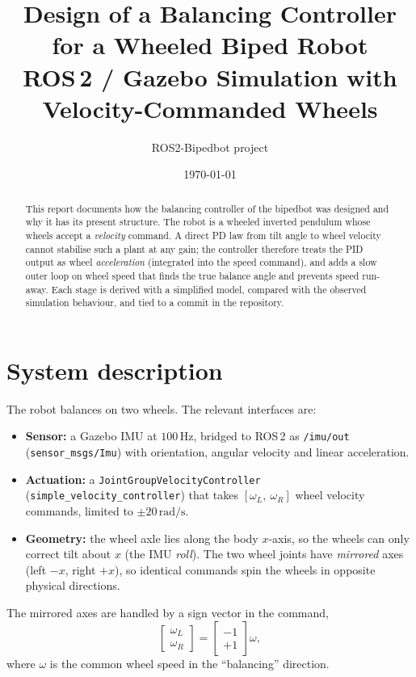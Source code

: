 \documentclass[11pt,a4paper]{article}
\title{Design of a Balancing Controller for a Wheeled Biped Robot\\
\large ROS\,2 / Gazebo Simulation with Velocity-Commanded Wheels}
\author{ROS2-Bipedbot project}
\date{\today}
\newcommand{\rads}{\,\mathrm{rad/s}}
\begin{document}
\maketitle

\begin{abstract}
This report documents how the balancing controller of the bipedbot was
designed and why it has its present structure. The robot is a wheeled
inverted pendulum whose wheels accept a \emph{velocity} command. A direct PD
law from tilt angle to wheel velocity cannot stabilise such a plant at any
gain; the controller therefore treats the PID output as wheel
\emph{acceleration} (integrated into the speed command), and adds a slow
outer loop on wheel speed that finds the true balance angle and prevents
speed run-away. Each stage is derived with a simplified model, compared with
the observed simulation behaviour, and tied to a commit in the repository.
\end{abstract}

\tableofcontents
\newpage

\section{System description}
The robot balances on two wheels. The relevant interfaces are:

\begin{itemize}
  \item \textbf{Sensor:} a Gazebo IMU at $100\,\mathrm{Hz}$, bridged to ROS\,2 as
        \texttt{/imu/out} (\texttt{sensor\_msgs/Imu}) with orientation,
        angular velocity and linear acceleration.
  \item \textbf{Actuation:} a \texttt{JointGroup\allowbreak Velocity\allowbreak Controller}
        (\texttt{simple\_\allowbreak velocity\_\allowbreak controller}) that takes
        $[\omega_L,\ \omega_R]$ wheel velocity commands, limited to
        $\pm 20\rads$.
  \item \textbf{Geometry:} the wheel axle lies along the body $x$-axis, so the
        wheels can only correct tilt about $x$ (the IMU \emph{roll}). The two
        wheel joints have \emph{mirrored} axes (left $-x$, right $+x$), so
        identical commands spin the wheels in opposite physical directions.
\end{itemize}

The mirrored axes are handled by a sign vector in the command,
\begin{equation}
  \begin{bmatrix}\omega_L\\ \omega_R\end{bmatrix}
  = \begin{bmatrix}-1\\ +1\end{bmatrix}\omega ,
  \label{eq:wheelmap}
\end{equation}
where $\omega$ is the common wheel speed in the ``balancing'' direction.
\end{document}
